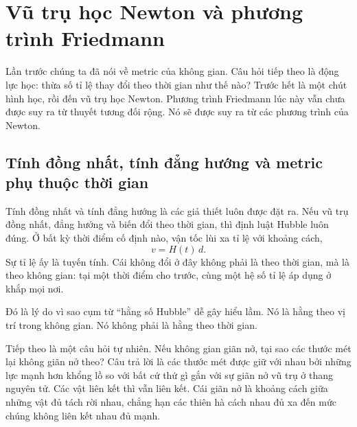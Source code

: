 \chapter{Vũ trụ học Newton và phương trình Friedmann}

Lần trước chúng ta đã nói về metric của không gian. Câu hỏi tiếp theo là động lực học: thừa số tỉ lệ thay đổi theo thời gian như thế nào? Trước hết là một chút hình học, rồi đến vũ trụ học Newton. Phương trình Friedmann lúc này vẫn chưa được suy ra từ thuyết tương đối rộng. Nó sẽ được suy ra từ các phương trình của Newton.

\section{Tính đồng nhất, tính đẳng hướng và metric phụ thuộc thời gian}

Tính đồng nhất và tính đẳng hướng là các giả thiết luôn được đặt ra. Nếu vũ trụ đồng nhất, đẳng hướng và biến đổi theo thời gian, thì định luật Hubble luôn đúng. Ở bất kỳ thời điểm cố định nào, vận tốc lùi xa tỉ lệ với khoảng cách,
\begin{equation}
v = H(t)\,d.
\end{equation}
Sự tỉ lệ ấy là tuyến tính. Cái không đổi ở đây không phải là theo thời gian, mà là theo không gian: tại một thời điểm cho trước, cùng một hệ số tỉ lệ áp dụng ở khắp mọi nơi.

\begin{classroomqa}
\end{classroomqa}

Đó là lý do vì sao cụm từ ``hằng số Hubble'' dễ gây hiểu lầm. Nó là hằng theo vị trí trong không gian. Nó không phải là hằng theo thời gian.

Tiếp theo là một câu hỏi tự nhiên. Nếu không gian giãn nở, tại sao các thước mét lại không giãn nở theo? Câu trả lời là các thước mét được giữ với nhau bởi những lực mạnh hơn khổng lồ so với bất cứ thứ gì gắn với sự giãn nở vũ trụ ở thang nguyên tử. Các vật liên kết thì vẫn liên kết. Cái giãn nở là khoảng cách giữa những vật đủ tách rời nhau, chẳng hạn các thiên hà cách nhau đủ xa đến mức chúng không liên kết nhau đủ mạnh.

